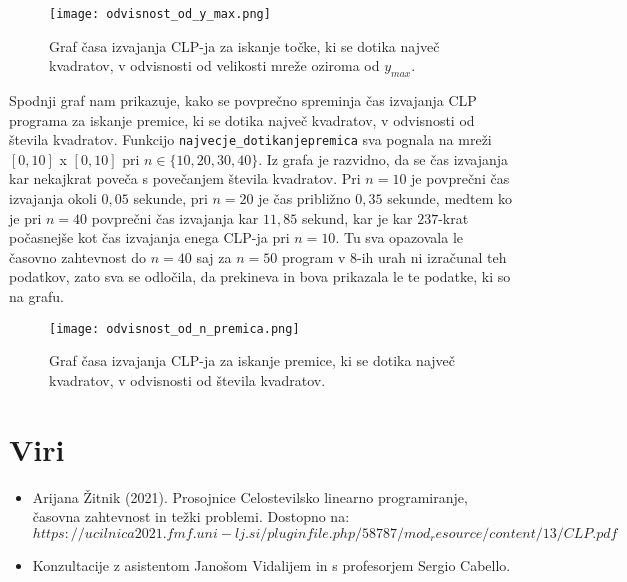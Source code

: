 \documentclass[a4paper]{article}
\begin{document}
\begin{figure}[h!]
  \centering
  \texttt{[image: odvisnost\_od\_y\_max.png]}
  \caption{Graf časa izvajanja CLP-ja za iskanje točke, ki se dotika največ kvadratov, v odvisnosti od velikosti mreže oziroma od $y_{max}$.}
\end{figure}

\newpage{}

Spodnji graf nam prikazuje, kako se povprečno spreminja čas izvajanja CLP programa za iskanje premice, ki se dotika največ kvadratov, v odvisnosti od števila kvadratov. Funkcijo \texttt{najvecje\_dotikanjepremica} sva pognala na mreži $[0,10]$ x $[0,10]$ pri $n \in \{10, 20, 30, 40\}.$ Iz grafa je razvidno, da se čas izvajanja kar nekajkrat poveča s povečanjem števila kvadratov. Pri $n=10$ je povprečni čas izvajanja okoli $0,05$ sekunde, pri $n=20$ je čas približno $0,35$ sekunde, medtem ko je pri $n=40$ povprečni čas izvajanja kar $11,85$ sekund, kar je kar $237$-krat počasnejše kot čas izvajanja enega CLP-ja pri $n=10.$ Tu sva opazovala le časovno zahtevnost do $n=40$ saj za $n=50$ program v 8-ih urah ni izračunal teh podatkov, zato sva se odločila, da prekineva in bova prikazala le te podatke, ki so na grafu.
\begin{figure}[h!]
  \centering
  \texttt{[image: odvisnost\_od\_n\_premica.png]}
  \caption{Graf časa izvajanja CLP-ja za iskanje premice, ki se dotika največ kvadratov, v odvisnosti od števila kvadratov.}
\end{figure}

\newpage{}

\section{Viri}
\begin{itemize}
\item Arijana Žitnik (2021). Prosojnice Celostevilsko linearno programiranje, časovna zahtevnost in težki problemi. Dostopno na:$https://ucilnica2021.fmf.uni-lj.si/pluginfile.php/58787/mod_resource/content/13/CLP.pdf$
\item Konzultacije z asistentom Janošom Vidalijem in s profesorjem Sergio Cabello.
\end{itemize}
\end{document}
